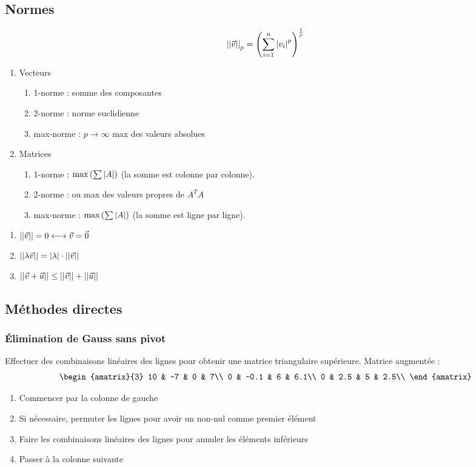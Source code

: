 \documentclass[resume]{subfiles}
\begin{document}
	\subsection{Normes}
	$$\abs{\abs{\vec{v}}}_p=\left(\sum_{i=1}^{n}\abs{v_i}^p\right)^{\frac{1}{p}}$$
	\begin{enumerate}
	\item Vecteurs
		\begin{enumerate}
	\item 1-norme : somme des composantes
	\item 2-norme : norme euclidienne
	\item max-norme : $p\to\infty$ max des valeurs absolues
	\end{enumerate}
	\item Matrices
	\begin{enumerate}
	\item 1-norme : $\max\left(\sum\abs{A}\right)$ (la somme est colonne par colonne).
	\item 2-norme : ou max des valeurs propres de $A^{T}A$
	\item max-norme : $\max\left(\sum\abs{A}\right)$ (la somme est ligne par ligne).
	\end{enumerate}
	\end{enumerate}

	\begin{enumerate}
	\item $\abs{\abs{\vec{v}}}=0\longleftrightarrow \vec{v}=\vec{0}$
	\item $\abs{\abs{\lambda\vec{v}}}=\abs{\lambda}\cdot \abs{\abs{\vec{v}}}$
	\item $\abs{\abs{\vec{v}+\vec{u}}}\leq \abs{\abs{\vec{v}}}+\abs{\abs{\vec{u}}}$
	\end{enumerate}
	\subsection{Méthodes directes}
	\subsubsection{Élimination de Gauss sans pivot}
	Effectuer des combinaisons linéaires des lignes pour obtenir une matrice triangulaire supérieure. Matrice augmentée :
	$$\begin{amatrix}{3}
10 & -7 & 0 & 7\\
0 & -0.1 & 6 & 6.1\\
0 & 2.5 & 5 & 2.5\\
\end{amatrix}$$
\begin{enumerate}
\item Commencer par la colonne de gauche
\item Si nécessaire, permuter les lignes pour avoir un non-nul comme premier élément
\item Faire les combinaisons linéaires des lignes pour annuler les éléments inférieurs
\item Passer à la colonne suivante
\end{enumerate}
\end{document}
